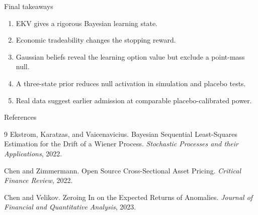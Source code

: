 \documentclass[aspectratio=169,10pt]{beamer}
\newcommand{\1}{\mathbf{1}}
\begin{document}
\begin{frame}{Final takeaways}
  \Large
  \begin{enumerate}
    \item EKV gives a rigorous Bayesian learning state.
    \item Economic tradeability changes the stopping reward.
    \item Gaussian beliefs reveal the learning option value but exclude a point-mass null.
    \item A three-state prior reduces null activation in simulation and placebo tests.
    \item Real data suggest earlier admission at comparable placebo-calibrated power.
  \end{enumerate}
\end{frame}

\begin{frame}{References}
  \small
  \begin{thebibliography}{9}
    Ekstrom, Karatzas, and Vaicenavicius.
    \newblock Bayesian Sequential Least-Squares Estimation for the Drift of a Wiener Process.
    \newblock \emph{Stochastic Processes and their Applications}, 2022.

    Chen and Zimmermann.
    \newblock Open Source Cross-Sectional Asset Pricing.
    \newblock \emph{Critical Finance Review}, 2022.

    Chen and Velikov.
    \newblock Zeroing In on the Expected Returns of Anomalies.
    \newblock \emph{Journal of Financial and Quantitative Analysis}, 2023.
  \end{thebibliography}
\end{frame}
\end{document}
